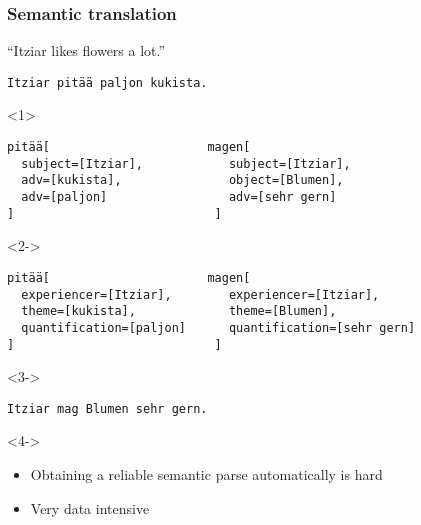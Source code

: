 \documentclass{beamer}
\begin{document}
\begin{frame}[fragile]
  \frametitle{Semantic translation}
``Itziar likes flowers a lot.''
\begin{verbatim}
Itziar pitää paljon kukista.
\end{verbatim}

\begin{onlyenv}<1>
\begin{verbatim}
pitää[                      magen[
  subject=[Itziar],            subject=[Itziar],
  adv=[kukista],               object=[Blumen],
  adv=[paljon]                 adv=[sehr gern]
]                            ]
\end{verbatim}
\end{onlyenv}
\begin{onlyenv}<2->
\begin{small}
\begin{verbatim}
pitää[                      magen[
  experiencer=[Itziar],        experiencer=[Itziar],
  theme=[kukista],             theme=[Blumen],
  quantification=[paljon]      quantification=[sehr gern]
]                            ]
\end{verbatim}
\end{small}
\end{onlyenv}


\begin{onlyenv}<3->
\begin{verbatim}
Itziar mag Blumen sehr gern.
\end{verbatim}
\end{onlyenv}

\begin{onlyenv}<4->
\begin{itemize}
  \item Obtaining a reliable semantic parse automatically is hard
  \item Very data intensive
\end{itemize}
\end{onlyenv}

\end{frame}
\end{document}
